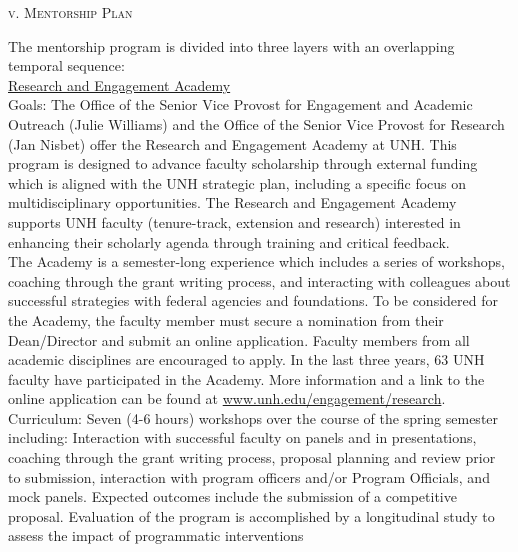 \documentclass[11pt]{article}
\begin{document}

\normalsize 
\begin{center}
\textsc{{v. Mentorship Plan}} \\
\end{center}

\noindent The mentorship program is divided into three layers with an overlapping temporal sequence: \\

\noindent \ul{Research and Engagement Academy} \\

Goals: The Office of the Senior Vice Provost for Engagement and Academic Outreach (Julie Williams) and the Office of the Senior Vice Provost for Research (Jan Nisbet) offer the Research and Engagement Academy at UNH.  This program is designed to advance faculty scholarship through external funding which is aligned with the UNH strategic plan, including a specific focus on multidisciplinary opportunities.  The Research and Engagement Academy supports UNH faculty (tenure-track, extension and research) interested in enhancing their scholarly agenda through training and critical feedback. \\

The Academy is a semester-long experience which includes a series of workshops, coaching through the grant writing process, and interacting with colleagues about successful strategies with federal agencies and foundations. To be considered for the Academy, the faculty member must secure a nomination from their Dean/Director and submit an online application. Faculty members from all academic disciplines are encouraged to apply. In the last three years, 63 UNH faculty have participated in the Academy.  More information and a link to the online application can be found at \url{www.unh.edu/engagement/research}. \\

Curriculum:  Seven (4-6 hours) workshops over the course of the spring semester including: Interaction with successful faculty on panels and in presentations, coaching through the grant writing process, proposal planning and review prior to submission, interaction with program officers and/or Program Officials, and mock panels.  
Expected outcomes include the submission of a competitive proposal.  Evaluation of the program is accomplished by a longitudinal study to assess the impact of programmatic interventions \\
\end{document}
